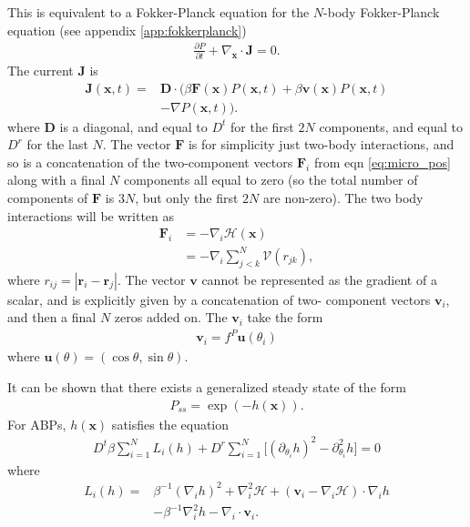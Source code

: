 \documentclass[twocolumn,amsmath,amssymb,aps]{revtex4-1}%
\begin{document}
This is equivalent to a Fokker-Planck equation for the $N$-body Fokker-Planck
equation (see appendix \ref{app:fokkerplanck})
\begin{align}\label{eq:NparticleFP}
  \frac{\partial P}{\partial t} +
  \nabla_{\bm{x}}\cdot\bm{J}=0.
\end{align}
The current $\bm{J}$ is
\begin{align}\label{eq:Nparticlecurrent}
  \bm{J}(\bm{x},t)=
  &\bm{D}\cdot(\beta\bm{F}(\bm{x})P(\bm{x},t)
  +\beta\bm{v}(\bm{x})P(\bm{x},t)\nonumber\\
  &-\nabla P(\bm{x},t)).
\end{align}
where $\bm{D}$ is a diagonal, and equal to $D^t$ for the first $2N$ components,
and equal to $D^r$ for the last $N$.
The vector $\bm{F}$ is for simplicity just two-body interactions, and so is a
concatenation of the two-component vectors $\bm{F}_i$ from eqn
\ref{eq:micro_pos} along with a final $N$ components all equal to zero (so the
total number of components of $\bm{F}$ is $3N$, but only the first $2N$ are
non-zero). The two body interactions will be written as
\begin{align}\label{eq:general_conservative_force}
  \bm{F}_i&=-\nabla_{i}\mathcal{H}(\bm{x})\nonumber\\
                &=-\nabla_{i}\sum_{j<k}^N\mathcal{V}(r_{jk}),
\end{align}
where $r_{ij}=|\bm{r}_i-\bm{r}_j|$.
The vector $\bm{v}$ cannot be represented
as the gradient of a scalar, and is explicitly given by a concatenation of two-
component vectors $\bm{v}_i$, and then a final $N$ zeros added on. The
$\bm{v}_i$ take the form
\begin{align}\label{eq:dissipative_force}
  \bm{v}_i =f^P\bm{u}(\theta_i)
\end{align}
where $\bm{u}(\theta)=(\cos\theta,\sin\theta)$.

It can be shown \cite{liverpool2018nonequilibrium} that there exists a
generalized steady state of the form
\begin{align}
  P_{ss}=\exp(-h(\bm{x})).
\end{align}
For ABPs, $h(\bm{x})$ satisfies the equation
\begin{align}\label{eq:steadystatecondition}
  D^t\beta\sum_{i=1}^{N}L_i(h)
  +D^r\sum_{i=1}^{N}\big[(\partial_{\theta_i}h)^2
  -\partial_{\theta_i}^2h\big]=0
\end{align}
where
\begin{align}\label{eq:L_i}
  L_i(h) =& \beta^{-1}(\nabla_ih)^2+\nabla_i^2\mathcal{H}
  +(\bm{v}_i-\nabla_i\mathcal{H})\cdot\nabla_ih\nonumber\\
  &-\beta^{-1}\nabla_i^2h-\nabla_i\cdot\bm{v}_i.
\end{align}
\end{document}

